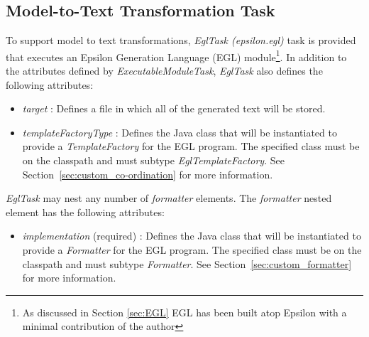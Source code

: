 
\subsection{Model-to-Text Transformation Task}
\label{sec:EglTask}
To support model to text transformations, \textit{EglTask (epsilon.egl)} task is provided that executes an Epsilon Generation Language (EGL) module\footnote{As discussed in Section \ref{sec:EGL} EGL has been built atop Epsilon with a minimal contribution of the author}. In addition to the attributes defined by \textit{ExecutableModuleTask}, \textit{EglTask} also defines the following attributes:

\begin{itemize}
	\item \textit{target} : Defines a file in which all of the generated text will be stored.
	\item \textit{templateFactoryType} : Defines the Java class that will be instantiated to provide a \emph{TemplateFactory} for the EGL program. The specified class must be on the classpath and must subtype \emph{EglTemplateFactory}. See Section~\ref{sec:custom_co-ordination} for more information.
\end{itemize}

\emph{EglTask} may nest any number of \emph{formatter} elements. The \emph{formatter} nested element has the following attributes:

\begin{itemize}
	\item \textit{implementation} (required) : Defines the Java class that will be instantiated to provide a \emph{Formatter} for the EGL program. The specified class must be on the classpath and must subtype \emph{Formatter}. See Section~\ref{sec:custom_formatter} for more information.
\end{itemize}
